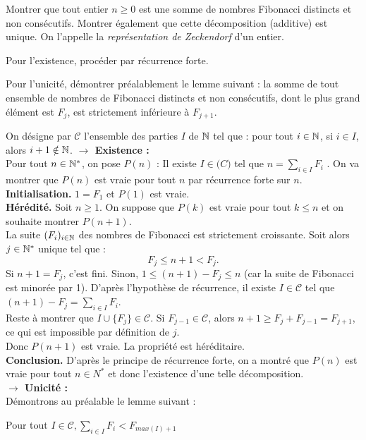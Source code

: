 \begin{exo}
Montrer que tout entier $n\geq 0$ est une somme de nombres Fibonacci distincts et non consécutifs. Montrer également que cette décomposition (additive) est unique. On l'appelle la \emph{représentation de Zeckendorf} d'un entier.
\begin{hint}
Pour l'existence, procéder par récurrence forte.

Pour l'unicité, démontrer préalablement le lemme suivant : la somme de tout ensemble de nombres de Fibonacci distincts et non consécutifs, dont le plus grand élément est $F_j$, est strictement inférieure à $F_{j + 1}$.
\end{hint}

\begin{sol}
On désigne par $\mathcal C$ l'ensemble des parties $I$ de $\mathbb N$ tel que : pour tout $i \in \mathbb N$, si $i \in I$, alors $i+1 \notin \mathbb N$.
\textbf{$\rightarrow$ Existence : }\\
Pour tout $n \in \mathbb N^*$, on pose $P(n)$ : \og Il existe $I \in \mathcal(C)$ tel que $n = \sum_{i \in I} F_i$ \fg. On va montrer que $P(n)$ est vraie pour tout $n$  par récurrence forte sur $n$.\\
\textbf{Initialisation.} $1 = F_1$ et $P(1)$ est vraie.\\
\textbf{Hérédité.} Soit $n \geq 1$. On suppose que $P(k)$ est vraie pour tout $k \leq n$ et on souhaite montrer $P(n+1)$.\\
La suite $(F_i)_{i \in \mathbb N}$ des nombres de Fibonacci est strictement croissante. Soit alors $j \in \mathbb N^*$ unique tel que :
$$ F_j \leq n+1 < F_j.$$
Si $n+1 = F_j$, c'est fini. Sinon, $1 \leq (n+1) - F_j \leq n$ (car la suite de Fibonacci est minorée par 1). D'après l'hypothèse de récurrence, il existe $I \in \mathcal{C}$ tel que $(n+1) - F_j = \sum_{i \in I} F_i$.\\
Reste à montrer que $I \cup \{F_j\} \in \mathcal{C}$. Si $F_{j-1} \in \mathcal{C}$, alors $n+1 \geq F_j + F_{j-1} = F_{j+1}$, ce qui est impossible par définition de $j$.\\
Donc $P(n+1)$ est vraie. La propriété est héréditaire.\\
\textbf{Conclusion.} D'après le principe de récurrence forte, on a montré que $P(n)$ est vraie pour tout $n \in N^*$ et donc l'existence d'une telle décomposition.\\


\textbf{$\rightarrow$ Unicité : }\\
Démontrons au préalable le lemme suivant : 
\begin{center}
Pour tout $I \in \mathcal{C}, \sum_{i \in I} F_i < F_{max(I) + 1}$
\end{center}


\end{sol}
\end{exo}

